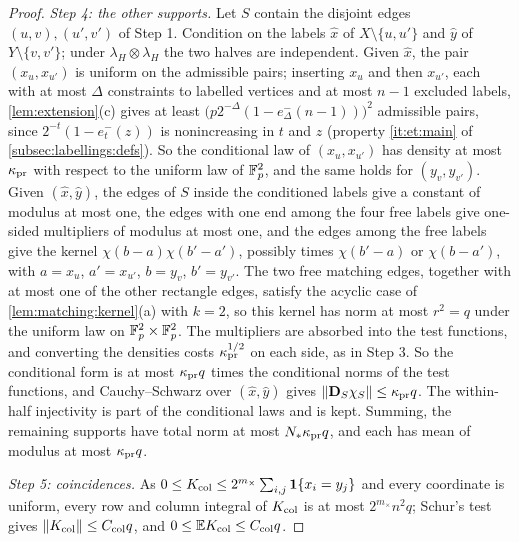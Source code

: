 \begin{proof}
\emph{Step 4: the other supports.} Let $S$ contain the disjoint edges
$(u,v),(u',v')$ of Step 1. Condition on the labels $\hat x$ of
$X\setminus\{u,u'\}$ and $\hat y$ of $Y\setminus\{v,v'\}$; under
$\lambda_H\otimes\lambda_H$ the two halves are independent. Given $\hat x$, the
pair $(x_u,x_{u'})$ is uniform on the admissible pairs; inserting $x_u$ and
then $x_{u'}$, each with at most $\Delta$ constraints to labelled vertices and
at most $n-1$ excluded labels, \cref{lem:extension}(c) gives at least
$\bigl(p2^{-\Delta}(1-e^-_\Delta(n-1))\bigr)^2$ admissible pairs, since
$2^{-t}(1-e^-_t(z))$ is nonincreasing in $t$ and $z$ (property
\ref{it:et:main} of \cref{subsec:labellings:defs}). So the conditional law
of $(x_u,x_{u'})$ has density at most $\kappa_{\rm pr}$ with respect to the
uniform law of $\mathbb F_p^2$, and the same holds for $(y_v,y_{v'})$. Given
$(\hat x,\hat y)$, the edges of $S$ inside the conditioned labels give a
constant of modulus at most one, the edges with one end among the four free
labels give one-sided multipliers of modulus at most one, and the edges
among the free labels give the kernel
$\chi(b-a)\chi(b'-a')$, possibly times $\chi(b'-a)$ or $\chi(b-a')$, with
$a=x_u$, $a'=x_{u'}$, $b=y_v$, $b'=y_{v'}$. The two free matching edges,
together with at most one of the other rectangle edges, satisfy the acyclic case of \cref{lem:matching:kernel}(a)
with $k=2$, so this kernel has norm at most $r^2=q$ under the uniform law
on $\mathbb F_p^2\times\mathbb F_p^2$. The multipliers are absorbed into the test functions,
and converting the densities costs $\kappa_{\rm pr}^{1/2}$ on each side, as in Step 3. So the
conditional form is at most $\kappa_{\rm pr}q$ times the conditional norms of
the test functions, and Cauchy--Schwarz over $(\hat x,\hat y)$ gives
$\|\mathbf D_S\chi_S\|\le\kappa_{\rm pr}q$. The within-half injectivity is part of
the conditional laws and is kept. Summing, the remaining supports have total
norm at most $N_*\kappa_{\rm pr}q$, and each has mean of modulus at most
$\kappa_{\rm pr}q$.

\emph{Step 5: coincidences.} As $0\le K_{\rm col}\le2^{m_\times}\sum_{i,j}\mathbf
1\{x_i=y_j\}$ and every coordinate is uniform, every row and column integral
of $K_{\rm col}$ is at most $2^{m_\times}n^2q$; Schur's test gives
$\|K_{\rm col}\|\le C_{\rm col}q$, and $0\le\mathbb E K_{\rm col}\le C_{\rm col}q$.


\end{proof}
